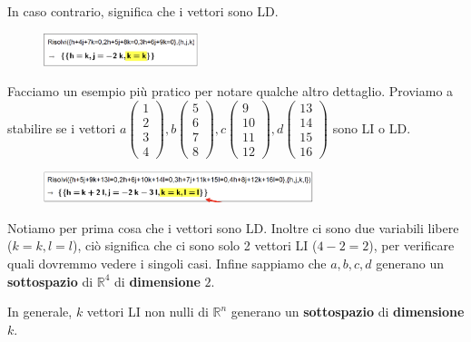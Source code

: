 \documentclass[../main.tex]{subfiles}
\begin{document}
In caso contrario, significa che i vettori sono LD.
\begin{figure}[h]
    \centering
    \includegraphics[width=0.4\textwidth]{../images/casLD.png}
\end{figure}

\vspace{1cm}
Facciamo un esempio più pratico per notare qualche altro dettaglio. Proviamo a stabilire se i vettori $a \begin{pmatrix}1 \\ 2 \\ 3 \\ 4 \end{pmatrix}, b \begin{pmatrix}5 \\ 6 \\ 7 \\ 8\end{pmatrix}, c \begin{pmatrix}9 \\ 10 \\ 11 \\ 12 \end{pmatrix}, d \begin{pmatrix}13 \\ 14 \\ 15 \\ 16 \end{pmatrix}$
sono LI o LD.

\begin{figure}[h]
    \centering
    \includegraphics[width=0.7\textwidth]{../images/casLD2.png}
\end{figure}
Notiamo per prima cosa che i vettori sono LD. Inoltre ci sono due variabili libere ($k=k, l=l$), ciò significa che ci sono solo
2 vettori LI ($4-2 = 2$), per verificare quali dovremmo vedere i singoli casi. Infine sappiamo che $a,b,c,d$ generano un \textbf{sottospazio}
di $\mathbb{R}^4$ di \textbf{dimensione} $2$.

In generale, $k$ vettori LI non nulli di $\mathbb{R}^n$ generano un \textbf{sottospazio} di \textbf{dimensione} $k$.
\end{document}

